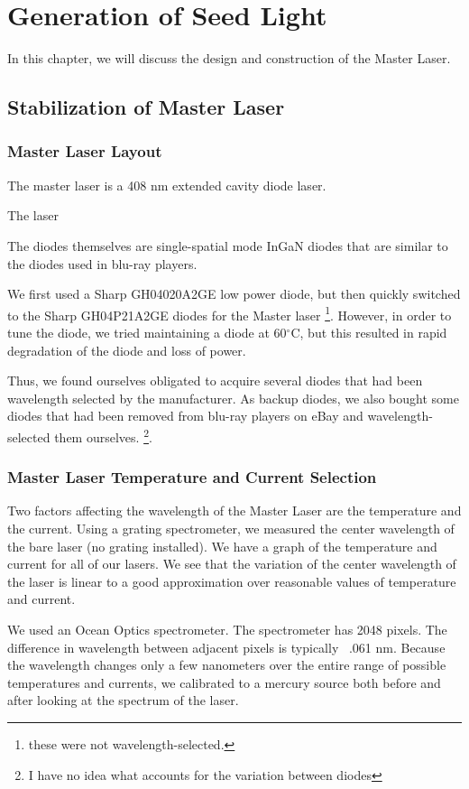 \chapter{Generation of Seed Light}\label{generationOfSeedLight}

In this chapter, we will discuss the design and construction of the Master Laser. 

\section{Stabilization of Master Laser}
\subsection{Master Laser Layout}
The master laser is a 408 nm extended cavity diode laser.

The laser 

The diodes themselves are single-spatial mode InGaN diodes that are similar to the diodes used in blu-ray players.

We first used a Sharp GH04020A2GE low power diode, but then quickly switched to the Sharp GH04P21A2GE diodes for the Master laser \footnote{these were not wavelength-selected.}. However, in order to tune the diode, we tried maintaining a diode at 60$^\circ$C, but this resulted in rapid degradation of the diode and loss of power. 

Thus, we found ourselves obligated to acquire several diodes that had been wavelength selected by the manufacturer. As backup diodes, we also bought some diodes that had been removed from blu-ray players on eBay and wavelength-selected them ourselves. \footnote{I have no idea what accounts for the variation between diodes}. 

\subsection{Master Laser Temperature and Current Selection}

Two factors affecting the wavelength of the Master Laser are the temperature and the current. Using a grating spectrometer, we measured the center wavelength of the bare laser (no grating installed). We have a graph of the temperature and current for all of our lasers. We see that the variation of the center wavelength of the laser is linear to a good approximation over reasonable values of temperature and current.

We used an Ocean Optics spectrometer. The spectrometer has 2048 pixels. The difference in wavelength between adjacent pixels is typically ~.061 nm. %
Because the wavelength changes only a few nanometers over the entire range of possible temperatures and currents, we calibrated to a mercury source both before and after looking at the spectrum of the laser. 

